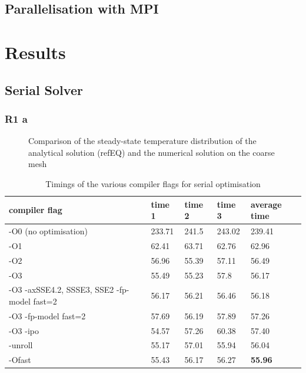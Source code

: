 \documentclass[a4paper, 11pt, oneside]{scrartcl}
\begin{document}
\subsection*{Parallelisation with MPI}

\section{Results}

\subsection{Serial Solver}

\subsubsection*{R1 a}

\begin{figure}[!htbp]
	\centering
	\leavevmode
	\resizebox{0.8\width}{!}{}
	\caption{Comparison of the steady-state temperature distribution of the analytical solution (refEQ) and the numerical solution on the coarse mesh}
	\label{fig::TemperatureDist}
\end{figure}

\renewcommand{\arraystretch}{2}
\begin{table}[h!]
	\begin{center}
		\begin{tabular}{| p{5cm} | p{1.5cm} p{1.5cm} p{1.5cm} | p{1.5cm} | }
			\hline
			\hline
			compiler flag & time 1 & time 2 & time 3 & average time\\
			\hline
			-O0 (no optimisation) & 233.71	& 241.5	& 243.02 & 239.41 \\
			\hline
			-O1 & 62.41	& 63.71	& 62.76	& 62.96\\
			\hline
			-O2 & 56.96	& 55.39	& 57.11	& 56.49\\
			\hline 
			-O3 & 55.49	& 55.23	& 57.8	& 56.17\\
			\hline
			-O3 -axSSE4.2, SSSE3, SSE2 -fp-model fast=2 & 56.17	& 56.21	& 56.46	& 56.18\\
			\hline
			-O3 -fp-model fast=2 & 57.69 & 56.19 & 57.89 & 57.26\\
			\hline
			-O3 -ipo & 54.57 & 57.26 & 60.38 & 57.40\\
			\hline
			-unroll & 55.17	& 57.01	& 55.94	& 56.04\\
			\hline
			-Ofast & 55.43	& 56.17	& 56.27	& \textbf{55.96}\\
			\hline
			\hline
		\end{tabular}
		\caption{\label{tab:SerialTimings}  Timings of the various compiler flags for serial optimisation}
	\end{center}
\end{table}
\renewcommand{\arraystretch}{1}
\end{document}
